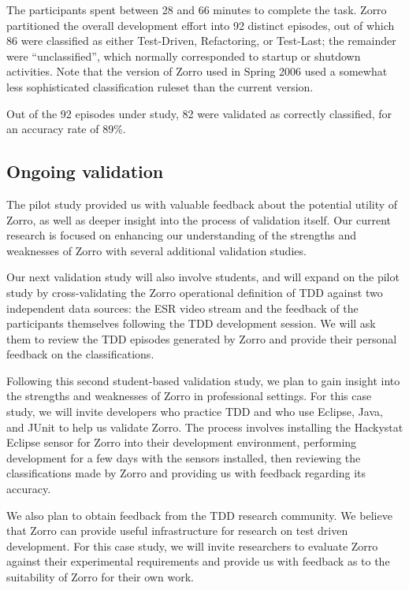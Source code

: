 \documentclass[smallextended]{svjour3}     %
\begin{document}
The participants spent between 28 and 66 minutes to complete the task.
Zorro partitioned the overall development effort into 92 distinct episodes,
out of which 86 were classified as either Test-Driven, Refactoring, or
Test-Last; the remainder were ``unclassified'', which normally corresponded
to startup or shutdown activities.  Note that the version of Zorro used in
Spring 2006 used a somewhat less sophisticated classification ruleset than
the current version.

Out of the 92 episodes under study, 82 were validated as correctly
classified, for an accuracy rate of 89\%.

\subsection{Ongoing validation}

The pilot study provided us with valuable feedback about the potential
utility of Zorro, as well as deeper insight into the process of validation
itself.  Our current research is focused on enhancing our understanding of
the strengths and weaknesses of Zorro with several additional validation
studies.

Our next validation study will also involve students, and will expand on
the pilot study by cross-validating the Zorro operational definition of TDD
against two independent data sources: the ESR video stream and the feedback
of the participants themselves following the TDD development session.  We
will ask them to review the TDD episodes generated by Zorro and provide
their personal feedback on the classifications.

Following this second student-based validation study, we plan to gain
insight into the strengths and weaknesses of Zorro in professional
settings.  For this case study, we will invite developers who
practice TDD and who use Eclipse, Java, and JUnit to help us validate
Zorro.  The process involves installing the Hackystat Eclipse sensor for
Zorro into their development environment, performing development for a few
days with the sensors installed, then reviewing the classifications made by
Zorro and providing us with feedback regarding its accuracy.

We also plan to obtain feedback from the TDD research community.  We believe
that Zorro can provide useful infrastructure for research on test driven
development.  For this case study, we will invite researchers to 
evaluate Zorro against their experimental requirements and provide us with 
feedback as to the suitability of Zorro for their own work. 
\end{document}

